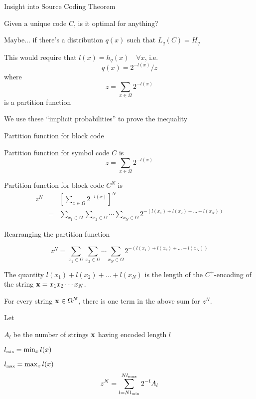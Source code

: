\documentclass{beamer}
\begin{document}
\begin{frame}{Insight into Source Coding Theorem}

\itemb
\item Given a unique code $C$, is it optimal for anything?
\item Maybe... if there's a distribution $q(x)$ such that $L_q(C) = H_q$
\item This would require that $l(x) = h_q(x) \quad \forall x$, i.e.
\[
q(x) = 2^{-l(x)} / z
\]
where
\[
z = \sum_{x \in {\Omega}} 2^{-l(x)}
\]
is a \alert{partition function}
\item We use these ``implicit probabilities'' to prove the inequality
\iteme

\end{frame}

\begin{frame}{Partition function for block code}

\itemb
\item Partition function for symbol code $C$ is
\[
z = \sum_{x \in {\Omega}} 2^{-l(x)}
\]
\item Partition function for block code $C^N$ is
\begin{eqnarray*}
z^N & = & \left[ \sum_{x \in {\Omega}} 2^{-l(x)} \right]^N \\
& = & \sum_{x_1 \in {\Omega}} \sum_{x_2 \in {\Omega}} \cdots \sum_{x_N \in {\Omega}} 2^{-(l(x_1)+l(x_2)+\ldots+l(x_N))}
\end{eqnarray*}
\iteme

\end{frame}

\begin{frame}{Rearranging the partition function}

\[
z^N = \sum_{x_1 \in {\Omega}} \sum_{x_2 \in {\Omega}} \cdots \sum_{x_N \in {\Omega}} 2^{-(l(x_1)+l(x_2)+\ldots+l(x_N))}
\]

\itemb
\item The quantity $l(x_1)+l(x_2)+\ldots+l(x_N)$ is the length of the $C^+$-encoding of the string ${\bf x} = x_1 x_2 \cdots x_N$.
\item For every string ${\bf x} \in {\Omega}^N$, there is one term in the above sum for $z^N$.
\item Let
 \itemb
 \item $A_l$ be the number of strings ${\bf x}$ having encoded length $l$
 \item $l_{\mbox{\tiny min}} = \min_x l(x)$
 \item $l_{\mbox{\tiny max}} = \max_x l(x)$
 \iteme
\[
z^N = \sum_{l = Nl_{\mbox{\tiny min}}}^{Nl_{\mbox{\tiny max}}} 2^{-l} A_l
\]
\iteme

\end{frame}
\end{document}
